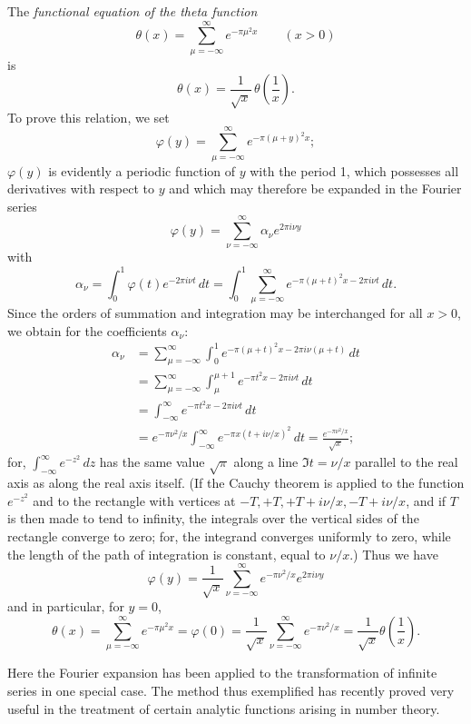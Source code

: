The 
\emph{functional equation of the theta function}
\[
\theta(x)=\sum_{\mu=-\infty}^{\infty}e^{-\pi\mu^2x}\qquad(x>0)
\]
is
\[
\theta(x)=\frac{1}{\sqrt{x}}\,\theta\!\left(\frac1x\right).
\]
To prove this relation, we set
\[
\varphi(y)=\sum_{\mu=-\infty}^{\infty}e^{-\pi(\mu+y)^2x};
\]
$\varphi(y)$ is evidently a periodic function of $y$ with the period 1, which possesses all derivatives with respect to $y$ and which may therefore be expanded in the Fourier series
\[
\varphi(y)=\sum_{\nu=-\infty}^{\infty}\alpha_\nu e^{2\pi i\nu y}
\]
with
\[
\alpha_\nu=\int_0^1\varphi(t)e^{-2\pi i\nu t}\,dt
=\int_0^1\sum_{\mu=-\infty}^{\infty}e^{-\pi(\mu+t)^2x-2\pi i\nu t}\,dt.
\]
Since the orders of summation and integration may be interchanged for all $x>0$, we obtain for the coefficients $\alpha_\nu$:
\[
\begin{aligned}
\alpha_\nu
&=\sum_{\mu=-\infty}^{\infty}\int_0^1
 e^{-\pi(\mu+t)^2x-2\pi i\nu(\mu+t)}\,dt\\
&=\sum_{\mu=-\infty}^{\infty}\int_\mu^{\mu+1}
 e^{-\pi t^2x-2\pi i\nu t}\,dt\\
&=\int_{-\infty}^{\infty}e^{-\pi t^2x-2\pi i\nu t}\,dt\\
&=e^{-\pi\nu^2/x}\int_{-\infty}^{\infty}
 e^{-\pi x(t+i\nu/x)^2}\,dt
=\frac{e^{-\pi\nu^2/x}}{\sqrt{x}};
\end{aligned}
\]
for, $\int_{-\infty}^{\infty}e^{-z^2}\,dz$ has the same value $\sqrt{\pi}$ along a line $\Im t=\nu/x$ parallel to the real axis as along the real axis itself. (If the Cauchy theorem is applied to the function $e^{-z^2}$ and to the rectangle with vertices at $-T,+T,+T+i\nu/x,-T+i\nu/x$, and if $T$ is then made to tend to infinity, the integrals over the vertical sides of the rectangle converge to zero; for, the integrand converges uniformly to zero, while the length of the path of integration is constant, equal to $\nu/x$.) Thus we have
\[
\varphi(y)=\frac{1}{\sqrt{x}}\sum_{\nu=-\infty}^{\infty}
 e^{-\pi\nu^2/x}e^{2\pi i\nu y}
\]
and in particular, for $y=0$,
\[
\theta(x)=\sum_{\mu=-\infty}^{\infty}e^{-\pi\mu^2x}
=\varphi(0)=\frac{1}{\sqrt{x}}\sum_{\nu=-\infty}^{\infty}e^{-\pi\nu^2/x}
=\frac{1}{\sqrt{x}}\theta\!\left(\frac1x\right).
\]

Here the Fourier expansion has been applied to the transformation of infinite series in one special case. The method thus exemplified has recently proved very useful in the treatment of certain analytic functions arising in number theory.

